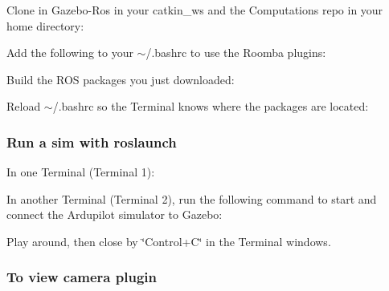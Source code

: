 Clone in Gazebo-\/\+Ros in your catkin\+\_\+ws and the Computations repo in your home directory\+: 
\begin{DoxyCode}{0}
\end{DoxyCode}


Add the following to your {\ttfamily $\sim$/.bashrc} to use the Roomba plugins\+: 
\begin{DoxyCode}{0}
\end{DoxyCode}


Build the R\+OS packages you just downloaded\+: 
\begin{DoxyCode}{0}
\end{DoxyCode}


Reload {\ttfamily $\sim$/.bashrc} so the Terminal knows where the packages are located\+: 
\begin{DoxyCode}{0}
\end{DoxyCode}


\subsubsection*{Run a sim with roslaunch}

In one Terminal (Terminal 1)\+: 
\begin{DoxyCode}{0}
\end{DoxyCode}
 In another Terminal (Terminal 2), run the following command to start and connect the Ardupilot simulator to Gazebo\+: 
\begin{DoxyCode}{0}
\end{DoxyCode}
 Play around, then close by \char`\"{}\+Control+\+C\char`\"{} in the Terminal windows.

\subsubsection*{To view camera plugin}

